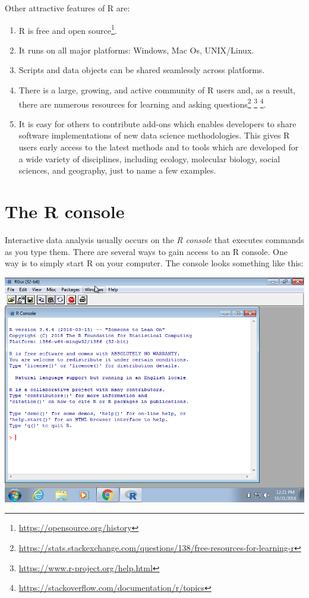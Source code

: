 \documentclass[
]{krantz}
\providecommand{\tightlist}{%
  \setlength{\itemsep}{0pt}\setlength{\parskip}{0pt}}
\begin{document}
Other attractive features of R are:

\begin{enumerate}
\def\labelenumi{\arabic{enumi}.}
\tightlist
\item
  R is free and open source\footnote{\url{https://opensource.org/history}}.
\item
  It runs on all major platforms: Windows, Mac Os, UNIX/Linux.
\item
  Scripts and data objects can be shared seamlessly across platforms.
\item
  There is a large, growing, and active community of R users and, as a result, there are numerous resources for learning and asking questions\footnote{\url{https://stats.stackexchange.com/questions/138/free-resources-for-learning-r}} \footnote{\url{https://www.r-project.org/help.html}} \footnote{\url{https://stackoverflow.com/documentation/r/topics}}.
\item
  It is easy for others to contribute add-ons which enables developers to share software implementations of new data science methodologies. This gives R users early access to the latest methods and to tools which are developed for a wide variety of disciplines, including ecology, molecular biology, social sciences, and geography, just to name a few examples.
\end{enumerate}

\hypertarget{the-r-console}{%
\section{The R console}\label{the-r-console}}

Interactive data analysis usually occurs on the \emph{R console} that executes commands as you type them. There are several ways to gain access to an R console. One way is to simply start R on your computer. The console looks something like this:

\begin{center}\includegraphics[width=0.7\linewidth]{R/img/R_console} \end{center}
\end{document}
